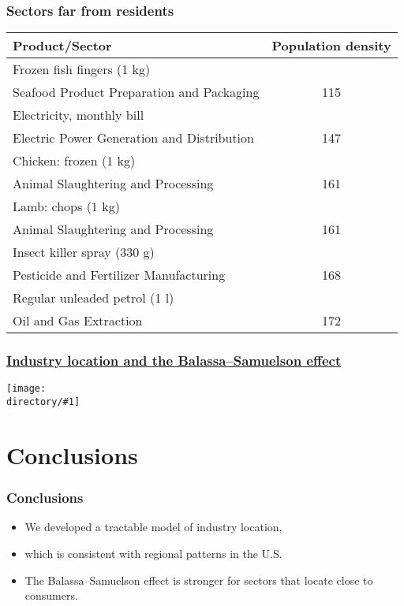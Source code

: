 \documentclass[compress,mathserif]{beamer}
\newcounter{perc}
\newcounter{percek}
\newcommand{\directory}{figures}
\newcommand{\widefigure}[2]{\begin{frame}\frametitle{\hyperlink{#1back}{#2}}\hypertarget{#1}{{\begin{center}\texttt{[image: \\directory/\#1]}\end{center}}}\end{frame}}
\renewcommand{\time}[1]{\addtocounter{percek}{#1}}
\begin{document}
\begin{frame}\frametitle{Sectors far from residents}
\begin{center}
\begin{tabular}{lc}
  \hline
  Product/Sector & Population density\\
  \hline
  Frozen fish fingers (1 kg)\\
  \hspace*{1em}Seafood Product Preparation and Packaging &115\\
  Electricity, monthly bill\\
  \hspace*{1em}Electric Power Generation and Distribution & 147\\
  Chicken: frozen (1 kg)\\
  \hspace*{1em}Animal Slaughtering and Processing & 161\\
  Lamb: chops (1 kg)\\
  \hspace*{1em}Animal Slaughtering and Processing & 161\\
  Insect killer spray (330 g)\\
  \hspace*{1em}Pesticide and Fertilizer Manufacturing & 168\\
  Regular unleaded petrol (1 l)\\
  \hspace*{1em}Oil and Gas Extraction & 172\\
  \hline
\end{tabular}
\end{center}
\end{frame}
\time 4

\widefigure{eiureg}{Industry location and the Balassa--Samuelson effect}
\time 3

\section{Conclusions}
\begin{frame}\frametitle{Conclusions}
\begin{itemize}
\item We developed a tractable model of industry location,
\item which is consistent with regional patterns in the U.S.
\item The Balassa--Samuelson effect is stronger for sectors that locate close to consumers.
\end{itemize}
\end{frame}
\end{document}
